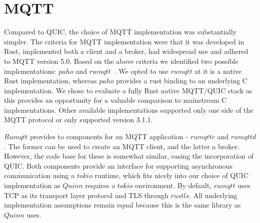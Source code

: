 \section{MQTT}\label{section:mqtt_impls}

Compared to QUIC, the choice of MQTT implementation was substantially simpler.
The criteria for MQTT implementation were that it was developed in Rust, implemented both a client and a broker, had widespread use and adhered to MQTT version 5.0.
Based on the above criteria we identified two possible implementations: $paho$ and $rumqtt$~\citep{bytebeam_rumqtt_2020}.
We opted to use $rumqtt$ at it is a native Rust implementation, whereas $paho$ provides a rust binding to an underlying C implementation.
We chose to evaluate a fully Rust native MQTT/QUIC stack as this provides an opportunity for a valuable comparison to mainstream C implementations.
Other available implementations supported only one side of the MQTT protocol or only supported version 3.1.1.

$Rumqtt$ provides to components for an MQTT application - $rumqttc$ and $rumqttd$.
The former can be used to create an MQTT client, and the latter a broker.
However, the code base for these is somewhat similar, easing the incorporation of QUIC.
Both components provide an interface for supporting asynchronous communication using a $tokio$ runtime, which fits nicely into our choice of QUIC implementation as $Quinn$ requires a $tokio$ environment.
By default, $rumqtt$ uses TCP as its transport layer protocol and TLS through $rustls$.
All underlying implementation assumptions remain equal because this is the same library as $Quinn$ uses.
